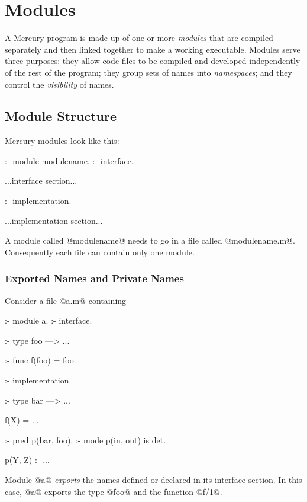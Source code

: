 
\chapter{Modules}

A Mercury program is made up of one or more \emph{modules} that are
compiled separately and then linked together to make a working
executable.  Modules serve three purposes: they allow code files to
be compiled and developed independently of the rest of the program; they
group sets of names into \emph{namespaces}; and they
control the \emph{visibility} of names.


\section{Module Structure}

Mercury modules look like this:
\begin{myverbatim}
:- module modulename.
:- interface.

    ...interface section...

:- implementation.

    ...implementation section...
\end{myverbatim}
A module called @modulename@ needs to go in a file called
@modulename.m@.  Consequently each file can contain only one module.

\subsection{Exported Names and Private Names}

Consider a file @a.m@ containing
\begin{myverbatim}
:- module a.
:- interface.

:- type foo ---> ...

:- func f(foo) = foo.

:- implementation.

:- type bar ---> ...

f(X) = ...

:- pred p(bar, foo).
:- mode p(in,  out) is det.

p(Y, Z) :- ...
\end{myverbatim}
Module @a@ \emph{exports} the names defined or declared in its interface
section.  In this case, @a@ exports the type @foo@ and the function
@f/1@.

